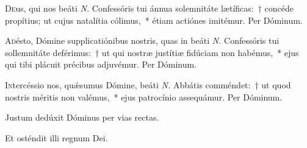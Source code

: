 \documentclass[vesperale_romanum.tex]{subfiles}
\begin{document}
\oratio

\lettrine{D}{e}us, qui nos beáti \textit{N.} Confessóris tui ánnua sole\-mnitáte lætíficas:~† concéde propítius; ut cujus natalítia cólimus,~* étiam actiónes imitémur. Per Dóminum.

\aliaoratio

\lettrine{A}{d}ésto, Dómine supplicatiónibus nostris, quas in beáti \textit{N.} Confessóris tui sollemnitáte deférimus:~† ut qui nostræ justítiæ fidúciam non habémus,~* ejus qui tibi plácuit précibus adjuvémur. Per Dóminum.

\lettrine{I}{n}tercéssio nos, quǽsumus Dómine, beáti \textit{N.} Abbátis comméndet:~† ut quod nostris méritis non valémus,~* ejus patrocínio assequámur. Per Dóminum.



\ivesperisrubrique

\vv Justum dedúxit Dóminus per vias rectas.

\rr Et osténdit illi regnum Dei.

\label{an_hic_vir_despiciens_solesmes_1961}
{}

\end{document}
